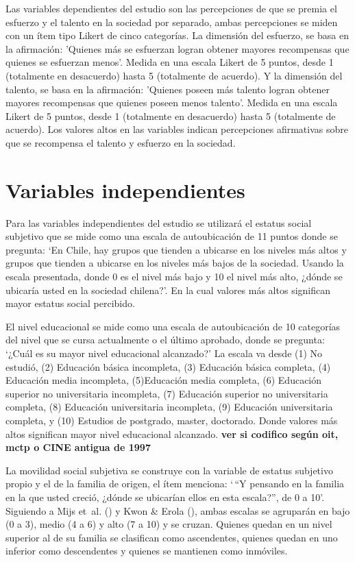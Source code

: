 \documentclass[
  spanish,
  a4paper,
  oneside]{scrbook}
\begin{document}
Las variables dependientes del estudio son las percepciones de que se
premia el esfuerzo y el talento en la sociedad por separado, ambas
percepciones se miden con un ítem tipo Likert de cinco categorías. La
dimensión del esfuerzo, se basa en la afirmación: 'Quienes más se
esfuerzan logran obtener mayores recompensas que quienes se esfuerzan
menos'. Medida en una escala Likert de 5 puntos, desde 1 (totalmente en
desacuerdo) hasta 5 (totalmente de acuerdo). Y la dimensión del talento,
se basa en la afirmación: 'Quienes poseen más talento logran obtener
mayores recompensas que quienes poseen menos talento'. Medida en una
escala Likert de 5 puntos, desde 1 (totalmente en desacuerdo) hasta 5
(totalmente de acuerdo). Los valores altos en las variables indican
percepciones afirmativas sobre que se recompensa el talento y esfuerzo
en la sociedad.

\section{Variables independientes}\label{variables-independientes}

Para las variables independientes del estudio se utilizará el estatus
social subjetivo que se mide como una escala de autoubicación de 11
puntos donde se pregunta: `En Chile, hay grupos que tienden a ubicarse
en los niveles más altos y grupos que tienden a ubicarse en los niveles
más bajos de la sociedad. Usando la escala presentada, donde 0 es el
nivel más bajo y 10 el nivel más alto, ¿dónde se ubicaría usted en la
sociedad chilena?'. En la cual valores más altos significan mayor
estatus social percibido.

El nivel educacional se mide como una escala de autoubicación de 10
categorías del nivel que se cursa actualmente o el último aprobado,
donde se pregunta: `¿Cuál es su mayor nivel educacional alcanzado?' La
escala va desde (1) No estudió, (2) Educación básica incompleta, (3)
Educación básica completa, (4) Educación media incompleta, (5)Educación
media completa, (6) Educación superior no universitaria incompleta, (7)
Educación superior no universitaria completa, (8) Educación
universitaria incompleta, (9) Educación universitaria completa, y (10)
Estudios de postgrado, master, doctorado. Donde valores más altos
significan mayor nivel educacional alcanzado. \textbf{ver si codifico
según oit, mctp o CINE antigua de 1997}

La movilidad social subjetiva se construye con la variable de estatus
subjetivo propio y el de la familia de origen, el ítem menciona: `\,``Y
pensando en la familia en la que usted creció, ¿dónde se ubicarían ellos
en esta escala?'', de 0 a 10'. Siguiendo a Mijs et~al.
() y Kwon \& Erola
(), ambas escalas se
agruparán en bajo (0 a 3), medio (4 a 6) y alto (7 a 10) y se cruzan.
Quienes quedan en un nivel superior al de su familia se clasifican como
ascendentes, quienes quedan en uno inferior como descendentes y quienes
se mantienen como inmóviles.
\end{document}
